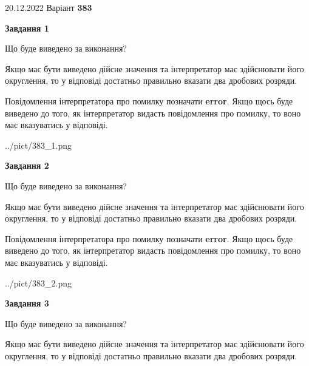 \documentclass[12pt, ukrainian]{article}
\begin{document}
{20.12.2022 Варіант \No \textbf { 383 }\par}
{
\begin {Large}

{\begin {center}\textbf{Завдання 1}\end {center}}\par
Що буде виведено за виконання? \par

Якщо має бути виведено дійсне значення та інтерпретатор має здійснювати його округлення, 
то у відповіді достатньо правильно вказати два дробових розряди.

Повідомлення інтерпретатора про помилку позначати \textbf{error}.
Якщо щось буде виведено до того, як інтерпретатор видасть повідомлення про помилку, 
то воно має вказуватись у відповіді. \par

\begin{center}
	{../pict/383_1.png}
\end{center}
\newpage

{\begin {center}\textbf{Завдання 2}\end {center}}\par
Що буде виведено за виконання? \par

Якщо має бути виведено дійсне значення та інтерпретатор має здійснювати його округлення, 
то у відповіді достатньо правильно вказати два дробових розряди.

Повідомлення інтерпретатора про помилку позначати \textbf{error}.
Якщо щось буде виведено до того, як інтерпретатор видасть повідомлення про помилку, 
то воно має вказуватись у відповіді. \par

\begin{center}
	{../pict/383_2.png}
\end{center}
\newpage

{\begin {center}\textbf{Завдання 3}\end {center}}\par
Що буде виведено за виконання? \par

Якщо має бути виведено дійсне значення та інтерпретатор має здійснювати його округлення, 
то у відповіді достатньо правильно вказати два дробових розряди.


\end{Large}}
\end{document}
